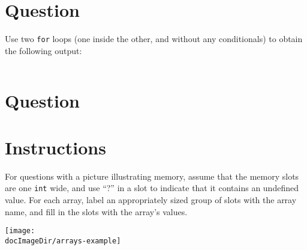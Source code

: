 
\newpage

\section{Question}

Use two \texttt{for} loops (one inside the other, and without any
conditionals) to obtain the following output:

\inputminted[label=Output]{cpp}{\docCodeDir/.control.gen.output}


\newpage

\section{Question}


\section*{Instructions}

For questions with a picture illustrating memory, assume that the memory slots
are one \texttt{int} wide, and use ``?'' in a slot to indicate that it
contains an undefined value.  For each array, label an appropriately sized
group of slots with the array name, and fill in the slots with the array's
values.

\vspace{2.7ex}
\begin{minipage}[t]{0.5\linewidth} \vspace{0ex}
  \vspace{-2.7ex}
  \memoryImage
  \par
  \vspace{-0.63in}
  \hspace{0.45in}
  \texttt{[image: \\docImageDir/arrays-example]}
\end{minipage}
\begin{minipage}[t]{0.5\linewidth} \vspace{0ex}
  \inputminted{cpp}{\docCodeDir/.arrays-example.cpp.gen.section.array}
\end{minipage}


